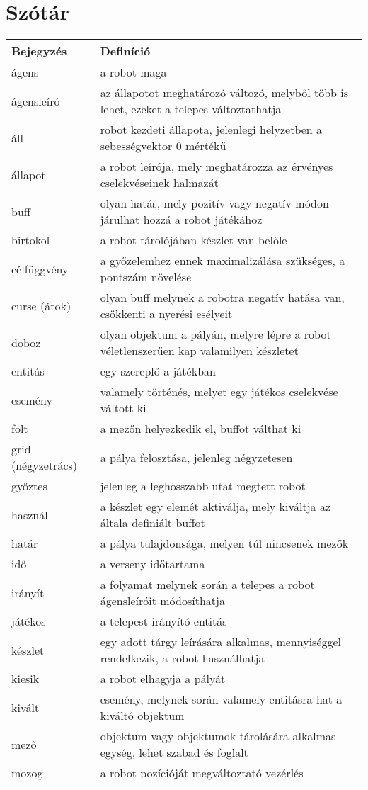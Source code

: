 \section{Szótár}

\begin{tabularx}{\textwidth}{| l | l |}
\hline
\textbf{Bejegyzés} & \textbf{Definíció} \tabularnewline 
\hline\hline
\endhead
    ágens & a robot maga \tabularnewline \hline
    ágensleíró &  az állapotot meghatározó változó, melyből több is lehet, ezeket a telepes változtathatja \tabularnewline \hline
    áll &  robot kezdeti állapota, jelenlegi helyzetben a sebességvektor 0 mértékű \tabularnewline \hline
    állapot &  a robot leírója, mely meghatározza az érvényes cselekvéseinek halmazát \tabularnewline \hline
    buff &  olyan hatás, mely pozitív vagy negatív módon járulhat hozzá a robot játékához \tabularnewline \hline
    birtokol & a robot tárolójában készlet van belőle \tabularnewline \hline
    célfüggvény & a győzelemhez ennek maximalizálása szükséges, a pontszám növelése  \tabularnewline \hline
    curse (átok) & olyan buff melynek a robotra negatív hatása van, csökkenti a nyerési esélyeit \tabularnewline \hline
    doboz & olyan objektum a pályán, melyre lépre a robot véletlenszerűen kap valamilyen készletet\tabularnewline \hline
    entitás &  egy szereplő a játékban \tabularnewline \hline 
    esemény & valamely történés, melyet egy játékos cselekvése váltott ki \tabularnewline \hline
    folt &  a mezőn helyezkedik el, buffot válthat ki \tabularnewline \hline
    grid (négyzetrács) & a pálya felosztása, jelenleg négyzetesen \tabularnewline \hline
    győztes &  jelenleg a leghosszabb utat megtett robot \tabularnewline \hline
    használ &  a készlet egy elemét aktiválja, mely kiváltja az általa definiált buffot \tabularnewline \hline
    határ &  a pálya tulajdonsága, melyen túl nincsenek mezők \tabularnewline \hline
    idő &  a verseny időtartama \tabularnewline \hline
    irányít &  a folyamat melynek során a telepes a robot ágensleíróit módosíthatja \tabularnewline \hline
    játékos &  a telepest irányító entitás \tabularnewline \hline
    készlet &  egy adott tárgy leírására alkalmas, mennyiséggel rendelkezik, a robot használhatja \tabularnewline \hline
    kiesik &  a robot elhagyja a pályát \tabularnewline \hline
    kivált &  esemény, melynek során valamely entitásra hat a kiváltó objektum \tabularnewline \hline
    mező &  objektum vagy objektumok tárolására alkalmas egység, lehet szabad és foglalt \tabularnewline \hline
    mozog &  a robot pozícióját megváltoztató vezérlés \tabularnewline \hline

\end{tabularx}
